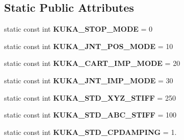 \subsection*{Static Public Attributes}
\begin{DoxyCompactItemize}
\item 
static const int {\bfseries K\+U\+K\+A\+\_\+\+S\+T\+O\+P\+\_\+\+M\+O\+DE} = 0\hypertarget{classkukadu_1_1KukieControlQueue_a8dd833cde832e46a18cff94c5d7b6178}{}\label{classkukadu_1_1KukieControlQueue_a8dd833cde832e46a18cff94c5d7b6178}

\item 
static const int {\bfseries K\+U\+K\+A\+\_\+\+J\+N\+T\+\_\+\+P\+O\+S\+\_\+\+M\+O\+DE} = 10\hypertarget{classkukadu_1_1KukieControlQueue_a0be0d5939cfa6de326762e2689f1e0b3}{}\label{classkukadu_1_1KukieControlQueue_a0be0d5939cfa6de326762e2689f1e0b3}

\item 
static const int {\bfseries K\+U\+K\+A\+\_\+\+C\+A\+R\+T\+\_\+\+I\+M\+P\+\_\+\+M\+O\+DE} = 20\hypertarget{classkukadu_1_1KukieControlQueue_af6dc1a4a6d11223b8384e3bdfad713e7}{}\label{classkukadu_1_1KukieControlQueue_af6dc1a4a6d11223b8384e3bdfad713e7}

\item 
static const int {\bfseries K\+U\+K\+A\+\_\+\+J\+N\+T\+\_\+\+I\+M\+P\+\_\+\+M\+O\+DE} = 30\hypertarget{classkukadu_1_1KukieControlQueue_a821a4327dd8d02a6e5bb914d8fb0a4f2}{}\label{classkukadu_1_1KukieControlQueue_a821a4327dd8d02a6e5bb914d8fb0a4f2}

\item 
static const int {\bfseries K\+U\+K\+A\+\_\+\+S\+T\+D\+\_\+\+X\+Y\+Z\+\_\+\+S\+T\+I\+FF} = 250\hypertarget{classkukadu_1_1KukieControlQueue_a4f36537e3f8d3968cd36460741f83ec3}{}\label{classkukadu_1_1KukieControlQueue_a4f36537e3f8d3968cd36460741f83ec3}

\item 
static const int {\bfseries K\+U\+K\+A\+\_\+\+S\+T\+D\+\_\+\+A\+B\+C\+\_\+\+S\+T\+I\+FF} = 100\hypertarget{classkukadu_1_1KukieControlQueue_a803666b1c82d70b7b84b05cedd5e4340}{}\label{classkukadu_1_1KukieControlQueue_a803666b1c82d70b7b84b05cedd5e4340}

\item 
static const int {\bfseries K\+U\+K\+A\+\_\+\+S\+T\+D\+\_\+\+C\+P\+D\+A\+M\+P\+I\+NG} = 1.\hypertarget{classkukadu_1_1KukieControlQueue_a1b73e604f852fe832da9016105a02c7c}{}\label{classkukadu_1_1KukieControlQueue_a1b73e604f852fe832da9016105a02c7c}


\end{DoxyCompactItemize}
